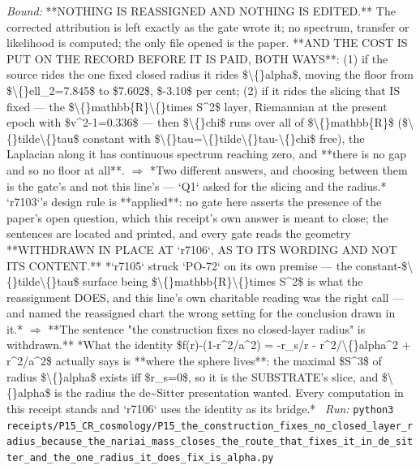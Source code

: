 \begin{description}
 \emph{Bound:}  **NOTHING IS REASSIGNED AND NOTHING IS EDITED.** The corrected attribution is left exactly as the gate wrote it; no spectrum, transfer or likelihood is computed; the only file opened is the paper.  **AND THE COST IS PUT ON THE RECORD BEFORE IT IS PAID, BOTH WAYS**: (1) if the source rides the one fixed closed radius it rides \$\textbackslash\{\}alpha\$, moving the floor from \$\textbackslash\{\}ell\_2=7.845\$ to \$7.602\$, \$-3.10\$ per cent; (2) if it rides the slicing that IS fixed --- the \$\textbackslash\{\}mathbb\{R\}\textbackslash\{\}times S\textasciicircum{}2\$ layer, Riemannian at the present epoch with \$v\textasciicircum{}2-1=0.336\$ --- then \$\textbackslash\{\}chi\$ runs over all of \$\textbackslash\{\}mathbb\{R\}\$ (\$\textbackslash\{\}tilde\textbackslash\{\}tau\$ constant with \$\textbackslash\{\}tau=\textbackslash\{\}tilde\textbackslash\{\}tau-\textbackslash\{\}chi\$ free), the Laplacian along it has continuous spectrum reaching zero, and **there is no gap and so no floor at all**. \ensuremath{\Rightarrow} *Two different answers, and choosing between them is the gate's and not this line's --- `Q1` asked for the slicing and the radius.*  `r7103`'s design rule is **applied**: no gate here asserts the presence of the paper's open question, which this receipt's own answer is meant to close; the sentences are located and printed, and every gate reads the geometry  **WITHDRAWN IN PLACE AT `r7106`, AS TO ITS WORDING AND NOT ITS CONTENT.** *`r7105` struck `PO-72` on its own premise --- the constant-\$\textbackslash\{\}tilde\textbackslash\{\}tau\$ surface being \$\textbackslash\{\}mathbb\{R\}\textbackslash\{\}times S\textasciicircum{}2\$ is what the reassignment DOES, and this line's own charitable reading was the right call --- and named the reassigned chart the wrong setting for the conclusion drawn in it.* \ensuremath{\Rightarrow} **The sentence "the construction fixes no closed-layer radius" is withdrawn.** *What the identity \$f(r)-(1-r\textasciicircum{}2/a\textasciicircum{}2) = -r\_s/r - r\textasciicircum{}2/\textbackslash\{\}alpha\textasciicircum{}2 + r\textasciicircum{}2/a\textasciicircum{}2\$ actually says is **where the sphere lives**: the maximal \$S\textasciicircum{}3\$ of radius \$\textbackslash\{\}alpha\$ exists iff \$r\_s=0\$, so it is the SUBSTRATE's slice, and \$\textbackslash\{\}alpha\$ is the radius the de\textasciitilde{}Sitter presentation wanted. Every computation in this receipt stands and `r7106` uses the identity as its bridge.*
\ \emph{Run:} \texttt{python3 receipts/P15\_CR\_cosmology/P15\_the\_construction\_fixes\_no\_closed\_layer\_radius\_because\_the\_nariai\_mass\_closes\_the\_route\_that\_fixes\_it\_in\_de\_sitter\_and\_the\_one\_radius\_it\_does\_fix\_is\_alpha.py}

\end{description}
